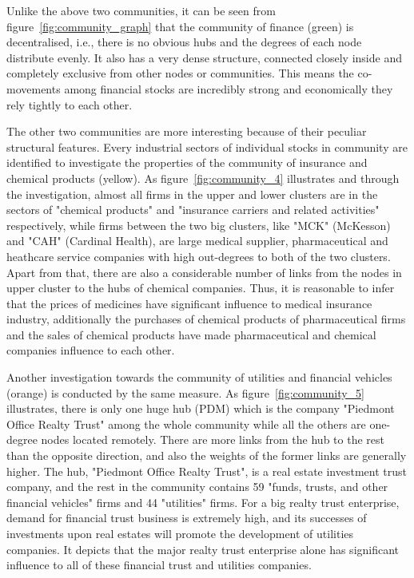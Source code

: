 Unlike the above two communities, it can be seen from figure~\ref{fig:community_graph} that the community of finance (green) is decentralised, i.e., there is no obvious hubs and the degrees of each node distribute evenly. It also has a very dense structure, connected closely inside and completely exclusive from other nodes or communities. This means the co-movements among financial stocks are incredibly strong and economically they rely tightly to each other.

The other two communities are more interesting because of their peculiar structural features. Every industrial sectors of individual stocks in community are identified to investigate the properties of the community of insurance and chemical products (yellow). As figure~\ref{fig:community_4} illustrates and through the investigation, almost all firms in the upper and lower clusters are in the sectors of "chemical products" and "insurance carriers and related activities" respectively, while firms between the two big clusters, like "MCK" (McKesson) and "CAH" (Cardinal Health), are large medical supplier, pharmaceutical and heathcare service companies with high out-degrees to both of the two clusters. Apart from that, there are also a considerable number of links from the nodes in upper cluster to the hubs of chemical companies. Thus, it is reasonable to infer that the prices of medicines have significant influence to medical insurance industry, additionally the purchases of chemical products of pharmaceutical firms and the sales of chemical products have made pharmaceutical and chemical companies influence to each other.

Another investigation towards the community of utilities and financial vehicles (orange) is conducted by the same measure. As figure~\ref{fig:community_5} illustrates, there is only one huge hub (PDM) which is the company "Piedmont Office Realty Trust" among the whole community while all the others are one-degree nodes located remotely. There are more links from the hub to the rest than the opposite direction, and also the weights of the former links are generally higher. The hub, "Piedmont Office Realty Trust", is a real estate investment trust company, and the rest in the community contains 59 "funds, trusts, and other financial vehicles" firms and 44 "utilities" firms. For a big realty trust enterprise, demand for financial trust business is extremely high, and its successes of investments upon real estates will promote the development of utilities companies. It depicts that the major realty trust enterprise alone has significant influence to all of these financial trust and utilities companies.


